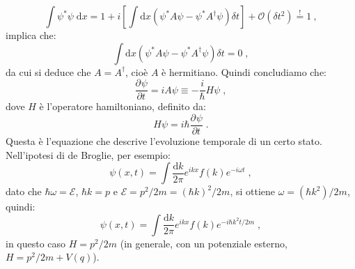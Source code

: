 \documentclass[10pt,a4paper]{report}
\theoremstyle{definition}
\newcommand{\pdev}[3][]{\frac{\partial^{#1} #2}{\partial #3^{#1}}}
\numberwithin{equation}{section}
\newcommand{\diff}[1][]{\mathrm{d}#1}
\begin{document}
$$
\int \psi^*\psi\;\diff{x}=1+i\left[\int\diff{x}(\psi^*A\psi-\psi^*A^{\dagger}\psi)\delta t\right]+\mathcal{O}(\delta t^2)\stackrel{!}{=}1\:,
$$
implica che:
$$
\int\diff{x}(\psi^*A\psi-\psi^*A^{\dagger}\psi)\delta t=0\;,
$$
da cui si deduce che $A=A^{\dagger}$, cioè $A$ è hermitiano. Quindi concludiamo che:
$$
\pdev{\psi}{t}=iA\psi\equiv -\frac{i}{\hbar}H\psi\;,
$$
dove $H$ è l'operatore hamiltoniano, definito da:
\begin{equation}
H\psi=i\hbar\pdev{\psi}{t}\;.
\end{equation}
Questa è l'equazione che descrive l'evoluzione temporale di un certo stato. \\
Nell'ipotesi di de Broglie, per esempio:
$$
\psi(x,t)=\int \frac{\diff{k}}{2\pi} e^{ikx}f(k)e^{-i\omega t}\;,
$$
dato che $\hbar\omega=\mathcal{E}$, $\hbar k=p$ e $\mathcal{E}=p^2/2m=(\hbar k)^2/2m$, si ottiene $\omega=(\hbar k^2)/2m$, quindi:
$$
\psi(x,t)=\int\frac{\diff{k}}{2\pi}e^{ikx}f(k)e^{-i\hbar k^2t/2m}\;,
$$
in questo caso $H=p^2/2m$ (in generale, con un potenziale esterno, $H=p^2/2m+V(q)$).
\end{document}
